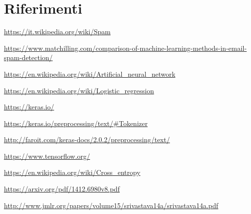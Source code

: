 \section*{Riferimenti}
\href{https://it.wikipedia.org/wiki/Spam}{https://it.wikipedia.org/wiki/Spam}

\href{https://www.matchilling.com/comparison-of-machine-learning-methods-in-email-spam-detection/}{https://www.matchilling.com/comparison-of-machine-learning-methods-in-email-spam-detection/}

\href{https://en.wikipedia.org/wiki/Artificial\_neural\_network}{https://en.wikipedia.org/wiki/Artificial\_neural\_network}

\href{https://en.wikipedia.org/wiki/Logistic\_regression}{https://en.wikipedia.org/wiki/Logistic\_regression}

\href{https://keras.io/}{https://keras.io/}

\href{https://keras.io/preprocessing/text/\#Tokenizer}{https://keras.io/preprocessing/text/\#Tokenizer}

\href{http://faroit.com/keras-docs/2.0.2/preprocessing/text/}{http://faroit.com/keras-docs/2.0.2/preprocessing/text/}

\href{https://www.tensorflow.org/}{https://www.tensorflow.org/}

\href{https://en.wikipedia.org/wiki/Cross\_entropy}{https://en.wikipedia.org/wiki/Cross\_entropy}

\href{https://arxiv.org/pdf/1412.6980v8.pdf}{https://arxiv.org/pdf/1412.6980v8.pdf}

\href{http://www.jmlr.org/papers/volume15/srivastava14a/srivastava14a.pdf}{http://www.jmlr.org/papers/volume15/srivastava14a/srivastava14a.pdf}